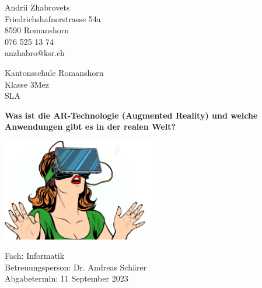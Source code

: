 \begin{titlepage}
    \clearpage\thispagestyle{empty}

    \begin{minipage}[t]{\textwidth}
        \begin{minipage}[t]{0.5\textwidth}
            Andrii Zhabrovets\\
            Friedrichshafnerstrasse 54a\\
            8590 Romanshorn\\
            076 525 13 74\\
            anzhabro@ksr.ch
        \end{minipage}
        \begin{minipage}[t]{0.5\textwidth}
            \begin{flushright}
                Kantonsschule Romanshorn\\
                Klasse 3Mez\\
                SLA
            \end{flushright}
        \end{minipage}
    \end{minipage}

    \vspace{4cm}


    {
    \centering

    \Huge\bfseries Was ist die AR-Technologie (Augmented Reality) und welche Anwendungen gibt es in der realen Welt?\par

    \vspace{1cm}

    \includegraphics[width=0.5\textwidth]{attachments/ar.png}\par
    }

    \vspace{46mm}

    \noindent
    Fach: Informatik\noindent \\ 
    Betreuungsperson: Dr. Andreas Schärer \\
    Abgabetermin: 11 September 2023 \\

\end{titlepage}